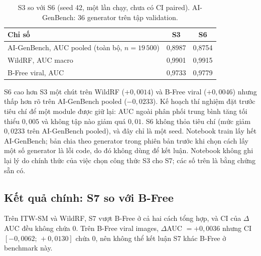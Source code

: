 \documentclass[11pt,a4paper]{article}
\begin{document}
\begin{table}[htbp]\centering\small
\caption{S3 so với S6 (seed 42, một lần chạy, chưa có CI paired). AI-GenBench: 36 generator trên tập validation.}\label{tab:interim}
\begin{tabular}{lcc}
\toprule
Chỉ số & S3 & S6 \\
\midrule
AI-GenBench, AUC pooled (toàn bộ, $n=19\,500$) & 0,8987 & 0,8754 \\
WildRF, AUC macro & 0,9901 & 0,9915 \\
B-Free viral, AUC & 0,9733 & 0,9779 \\
\bottomrule
\end{tabular}
\end{table}
S6 cao hơn S3 một chút trên WildRF ($+0{,}0014$) và B-Free viral ($+0{,}0046$) nhưng thấp hơn rõ trên AI-GenBench pooled ($-0{,}0233$). Kế hoạch thí nghiệm đặt trước tiêu chí để một module được giữ lại: AUC ngoài phân phối trung bình tăng tối thiểu $0{,}005$ và không tập nào giảm quá $0{,}01$. S6 không thỏa tiêu chí (mức giảm $0{,}0233$ trên AI-GenBench pooled), và đây chỉ là một seed. Notebook train lấy hết AI-GenBench; bản chia theo generator trong phiên bản trước khi chọn cách lấy một số generator là lỗi code, do đó không dùng để kết luận. Notebook không ghi lại lý do chính thức của việc chọn công thức S3 cho S7; các số trên là bằng chứng sẵn có.

\subsection{Kết quả chính: S7 so với B-Free}
\begin{table}[htbp]\centering\scriptsize
\caption{AUC theo benchmark. S7: trung bình $\pm$ độ lệch chuẩn qua 3 seed. $\Delta$AUC kèm CI 95\% paired bootstrap.}\label{tab:auc}
\end{table}
Trên ITW-SM và WildRF, S7 vượt B-Free ở cả hai cách tổng hợp, và CI của $\Delta$AUC đều không chứa $0$. Trên B-Free viral images, $\Delta$AUC $=+0{,}0036$ nhưng CI $[-0{,}0062;\,+0{,}0130]$ chứa $0$, nên không thể kết luận S7 khác B-Free ở benchmark này.
\end{document}
